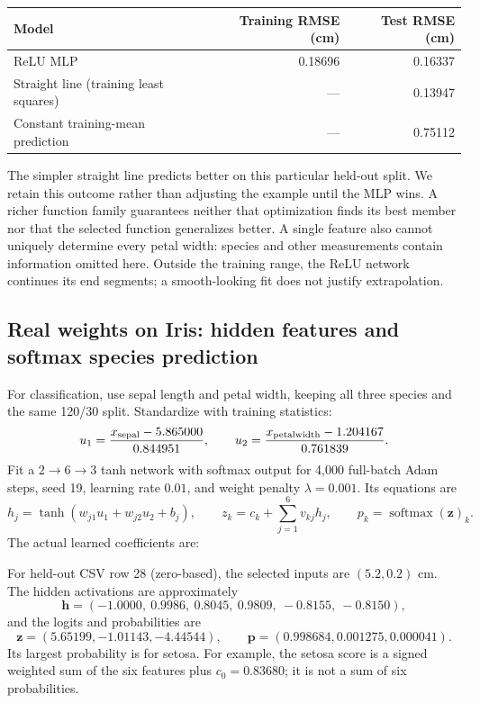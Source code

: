 \begin{center}
\begin{tabular}{lrr}
\toprule
Model & Training RMSE (cm) & Test RMSE (cm)\\
\midrule
ReLU MLP & 0.18696 & 0.16337\\
Straight line (training least squares) & --- & 0.13947\\
Constant training-mean prediction & --- & 0.75112\\
\bottomrule
\end{tabular}
\end{center}
The simpler straight line predicts better on this particular held-out split. We retain this outcome rather than adjusting the example until the MLP wins. A richer function family guarantees neither that optimization finds its best member nor that the selected function generalizes better. A single feature also cannot uniquely determine every petal width: species and other measurements contain information omitted here. Outside the training range, the ReLU network continues its end segments; a smooth-looking fit does not justify extrapolation.

\subsection{Real weights on Iris: hidden features and softmax species prediction}
For classification, use sepal length and petal width, keeping all three species and the same 120/30 split. Standardize with training statistics:
\[
 u_1=\frac{x_{\rm sepal}-5.865000}{0.844951},\qquad
 u_2=\frac{x_{\rm petalwidth}-1.204167}{0.761839}.
\]
Fit a $2\to6\to3$ tanh network with softmax output for 4,000 full-batch Adam steps, seed 19, learning rate $0.01$, and weight penalty $\lambda=0.001$. Its equations are
\[
 h_j=\tanh(w_{j1}u_1+w_{j2}u_2+b_j),\qquad
 z_k=c_k+\sum_{j=1}^6v_{kj}h_j,\qquad p_k=\operatorname{softmax}(\mathbf z)_k.
\]
The actual learned coefficients are:


For held-out CSV row 28 (zero-based), the selected inputs are $(5.2,0.2)$ cm. The hidden activations are approximately
\[
 \mathbf h=(-1.0000,\ 0.9986,\ 0.8045,\ 0.9809,\ -0.8155,\ -0.8150),
\]
and the logits and probabilities are
\[
 \mathbf z=(5.65199,-1.01143,-4.44544),\qquad
 \mathbf p=(0.998684,0.001275,0.000041).
\]
Its largest probability is for setosa. For example, the setosa score is a signed weighted sum of the six features plus $c_0=0.83680$; it is not a sum of six probabilities.

